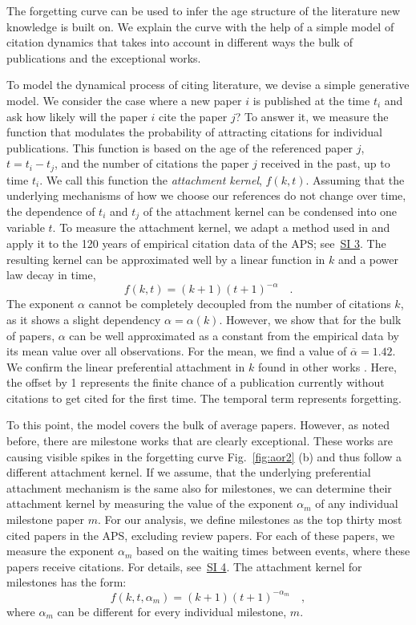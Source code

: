 \documentclass[draft,final]{vutinfth} %
\begin{document}
The forgetting curve can be used to infer the age structure of the literature new knowledge is built on. We explain the curve with the help of a simple model of citation dynamics that takes into account in different ways the bulk of  publications and the exceptional works. 

To model the dynamical process of citing literature, we devise a simple generative model. We consider the case where a new paper $i$ is published at the time $t_i$ and ask how likely will the paper $i$ cite the paper $j$? To answer it, we measure the function that modulates the  probability of attracting citations for individual publications. This function is based on the age of the referenced paper $j$, $t = t_i - t_j$, and the number of citations the paper $j$ received in the past, up to time $t_i$. We call this function the {\em attachment kernel},  $f(k,t)$. Assuming that the underlying mechanisms of how we choose our references do not change over time, the dependence of $t_i$ and $t_j$ of the attachment kernel can be condensed into one variable $t$. To measure the attachment kernel, we adapt a method used in \cite{Newman2001} and apply it to the 120 years of empirical citation data of the APS; see~\hyperref[SI3]{SI 3}. The resulting kernel can be approximated well by a linear function in $k$ and a power law decay in time,
%
\begin{equation}
   f(k, t)= (k+1)(t+1)^{-\alpha} \quad.
\end{equation}
%
The exponent $\alpha$ cannot be completely decoupled from the number of citations $k$, as it shows a slight dependency $\alpha = \alpha(k) $. However, we show that for the bulk of papers, $\alpha$ can be well approximated as a constant from the empirical data by its mean value over all observations. For the mean, we find a value of $\overline{\alpha} = 1.42$.  We confirm the linear preferential attachment in $k$ found in other works \cite{Jeong_2003}. Here, the offset by 1 represents the finite chance of a publication currently without citations to get cited for the first time. The temporal term represents forgetting.

To this point, the model covers the bulk of average papers. However, as noted before, there are milestone works that are clearly exceptional. These works are causing visible spikes in the forgetting curve Fig.~\ref{fig:aor2} (b) and thus follow a different attachment kernel. If we assume, that the underlying preferential attachment mechanism is the same also for milestones, we can determine their attachment kernel by measuring the value of the exponent $\alpha_m$ of any individual milestone paper $m$. For our analysis, we define milestones as the top thirty most cited papers in the APS, excluding review papers. For each of these papers, we measure the exponent $\alpha_m$ based on the waiting times between events, where these papers receive citations. For details, see~\hyperref[SIM4]{SI 4}. The attachment kernel for milestones has the form:
%
\begin{equation}
   f(k, t, \alpha_m)= (k+1)(t+1)^{-\alpha_m} \quad,
\end{equation}
where $\alpha_m$ can be different for every individual milestone, $m$.
\end{document}
